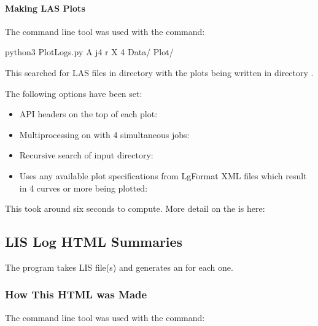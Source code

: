 \documentclass[letterpaper,10pt,english]{sphinxmanual}
\begin{document}
\paragraph{Making LAS Plots}
\label{\detokenize{examples/examples:making-las-plots}}
The  command line tool was used with the command:

\begin{sphinxVerbatim}[commandchars=\\\{\}]
\PYGZdl{} python3 PlotLogs.py \PYGZhy{}A \PYGZhy{}j4 \PYGZhy{}r \PYGZhy{}X 4 Data/ Plot/
\end{sphinxVerbatim}

This searched for LAS files in directory  with the plots being written in directory .

The following options have been set:
\begin{itemize}
\item {} 
API headers on the top of each plot: 

\item {} 
Multiprocessing on with 4 simultaneous jobs: 

\item {} 
Recursive search of input directory: 

\item {} 
Uses any available plot specifications from LgFormat XML files which result in 4 curves or more being plotted: 

\end{itemize}

This took around six seconds to compute. More detail on the  is here: {\hyperref[\detokenize{cmd_line_tools/TD_cmd_line_tools:totaldepth-cmdline-plotlogs}]{}}


\subsection{LIS Log HTML Summaries}
\label{\detokenize{examples/examples:lis-log-html-summaries}}
The program  takes LIS file(s) and generates an  for each one.


\subsubsection{How This HTML was Made}
\label{\detokenize{examples/examples:how-this-html-was-made}}
The  command line tool was used with the command:
\end{document}
